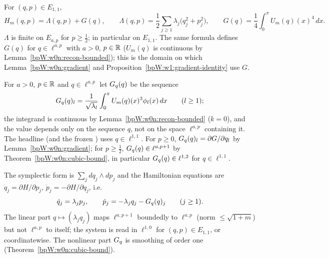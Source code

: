 \begin{definition}[Hamiltonian]\label{bpW:w0:H}
For $(q,p)\in E_{1,1}$,
\[H_m(q,p)=\Lambda(q,p)+G(q),\qquad \Lambda(q,p)=\frac12\sum_{j\ge1}\lambda_j\bigl(q_j^2+p_j^2\bigr),\qquad
G(q)=\frac14\int_0^\pi U_m(q)(x)^4\,dx.\]
$\Lambda$ is finite on $E_{a,p}$ for $p\ge\frac12$; in particular on $E_{1,1}$. The same formula defines $G(q)$ for
$q\in\ell^{a,p}$ with $a>0$, $p\in\mathbb{R}$ ($U_m(q)$ is continuous by Lemma~\ref{bpW:w0n:recon-bounded}); this is the
domain on which Lemma~\ref{bpW:w0n:gradient} and Proposition~\ref{bpW:w1:gradient-identity} use $G$.
\end{definition}

\begin{definition}\label{bpW:w0:Gq}
For $a>0$, $p\in\mathbb{R}$ and $q\in\ell^{a,p}$ let $G_q(q)$ be the sequence
\[G_q(q)_l=\frac{1}{\sqrt{\lambda_l}}\int_0^\pi U_m(q)(x)^3\phi_l(x)\,dx\qquad(l\ge1);\]
the integrand is continuous by Lemma~\ref{bpW:w0n:recon-bounded} ($k=0$), and the value depends only on the
sequence $q$, not on the space $\ell^{a,p}$ containing it. The headline (and the frozen ) uses
$q\in\ell^{1,1}$. For $p\ge0$, $G_q(q)_l=\partial G/\partial q_l$ by Lemma~\ref{bpW:w0n:gradient}; for $p\ge\frac12$,
$G_q(q)\in\ell^{a,p+1}$ by Theorem~\ref{bpW:w0n:cubic-bound}, in particular $G_q(q)\in\ell^{1,2}$ for $q\in\ell^{1,1}$.
\end{definition}

\begin{definition}\label{bpW:w0:eqmotion}
The symplectic form is $\sum_j dq_j\wedge dp_j$ and the Hamiltonian equations are $\dot q_j=\partial H/\partial p_j$,
$\dot p_j=-\partial H/\partial q_j$, i.e.
\begin{equation}\label{bpW:w0:coeffsys}
\dot q_j=\lambda_jp_j,\qquad \dot p_j=-\lambda_jq_j-G_q(q)_j\qquad(j\ge1).
\end{equation}
The linear part $q\mapsto(\lambda_jq_j)$ maps $\ell^{a,p+1}$ boundedly to $\ell^{a,p}$ (norm $\le\sqrt{1+m}$) but not
$\ell^{a,p}$ to itself; the system is read in $\ell^{1,0}$ for $(q,p)\in E_{1,1}$, or coordinatewise. The nonlinear
part $G_q$ is smoothing of order one (Theorem~\ref{bpW:w0n:cubic-bound}).
\end{definition}

